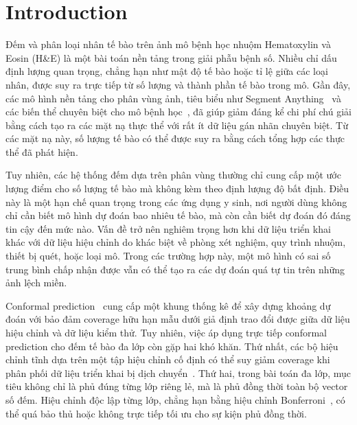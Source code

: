 \documentclass[pdflatex,sn-mathphys-num]{sn-jnl}
\begin{document}
\maketitle

\section{Introduction}\label{sec:intro}

Đếm và phân loại nhân tế bào trên ảnh mô bệnh học nhuộm Hematoxylin và Eosin
(H\&E) là một bài toán nền tảng trong giải phẫu bệnh số. Nhiều chỉ dấu định lượng
quan trọng, chẳng hạn như mật độ tế bào hoặc tỉ lệ giữa các loại nhân, được suy ra
trực tiếp từ số lượng và thành phần tế bào trong mô. Gần đây, các mô hình nền tảng
cho phân vùng ảnh, tiêu biểu như Segment Anything~\cite{kirillov2023segment} và các
biến thể chuyên biệt cho mô bệnh học~\cite{archit2025patho}, đã giúp giảm đáng kể
chi phí chú giải bằng cách tạo ra các mặt nạ thực thể với rất ít dữ liệu gán nhãn
chuyên biệt. Từ các mặt nạ này, số lượng tế bào có thể được suy ra bằng cách tổng
hợp các thực thể đã phát hiện.

Tuy nhiên, các hệ thống đếm dựa trên phân vùng thường chỉ cung cấp một ước lượng
điểm cho số lượng tế bào mà không kèm theo định lượng độ bất định. Điều này là một
hạn chế quan trọng trong các ứng dụng y sinh, nơi người dùng không chỉ cần biết mô
hình dự đoán bao nhiêu tế bào, mà còn cần biết dự đoán đó đáng tin cậy đến mức nào.
Vấn đề trở nên nghiêm trọng hơn khi dữ liệu triển khai khác với dữ liệu hiệu chỉnh
do khác biệt về phòng xét nghiệm, quy trình nhuộm, thiết bị quét, hoặc loại mô. Trong
các trường hợp này, một mô hình có sai số trung bình chấp nhận được vẫn có thể tạo ra
các dự đoán quá tự tin trên những ảnh lệch miền.

Conformal prediction~\cite{vovk2005algorithmic, angelopoulos2023gentle} cung cấp một
khung thống kê để xây dựng khoảng dự đoán với bảo đảm coverage hữu hạn mẫu dưới giả
định trao đổi được giữa dữ liệu hiệu chỉnh và dữ liệu kiểm thử. Tuy nhiên, việc áp
dụng trực tiếp conformal prediction cho đếm tế bào đa lớp còn gặp hai khó khăn. Thứ
nhất, các bộ hiệu chỉnh tĩnh dựa trên một tập hiệu chỉnh cố định có thể suy giảm
coverage khi phân phối dữ liệu triển khai bị dịch chuyển~\cite{barber2023conformal,
gibbs2021adaptive}. Thứ hai, trong bài toán đa lớp, mục tiêu không chỉ là phủ đúng
từng lớp riêng lẻ, mà là phủ đồng thời toàn bộ vector số đếm. Hiệu chỉnh độc lập từng
lớp, chẳng hạn bằng hiệu chỉnh Bonferroni~\cite{dunn1961multiple}, có thể quá bảo thủ
hoặc không trực tiếp tối ưu cho sự kiện phủ đồng thời.
\end{document}
